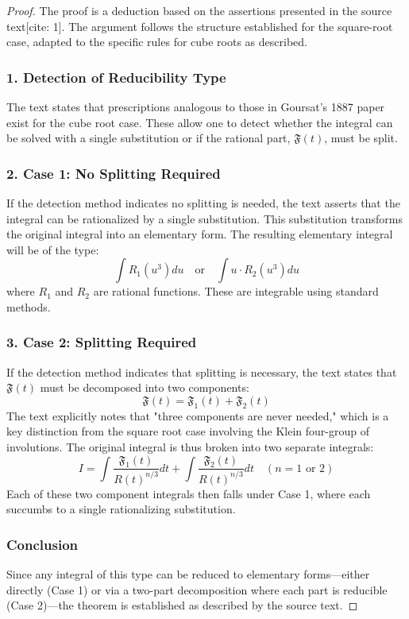 \documentclass{article}
\theoremstyle{plain}
\newcommand{\Fcal}{\mathfrak{F}}
\begin{document}
\begin{proof}
The proof is a deduction based on the assertions presented in the source text[cite: 1]. The argument follows the structure established for the square-root case, adapted to the specific rules for cube roots as described.

\subsubsection*{1. Detection of Reducibility Type}
The text states that prescriptions analogous to those in Goursat's 1887 paper exist for the cube root case. These allow one to detect whether the integral can be solved with a single substitution or if the rational part, $\Fcal(t)$, must be split.

\subsubsection*{2. Case 1: No Splitting Required}
If the detection method indicates no splitting is needed, the text asserts that the integral can be rationalized by a single substitution. This substitution transforms the original integral into an elementary form. The resulting elementary integral will be of the type:
$$ \int R_1(u^3) du \quad \text{or} \quad \int u \cdot R_2(u^3) du $$
where $R_1$ and $R_2$ are rational functions. These are integrable using standard methods.

\subsubsection*{3. Case 2: Splitting Required}
If the detection method indicates that splitting is necessary, the text states that $\Fcal(t)$ must be decomposed into two components:
$$ \Fcal(t) = \Fcal_1(t) + \Fcal_2(t) $$
The text explicitly notes that "three components are never needed," which is a key distinction from the square root case involving the Klein four-group of involutions. The original integral is thus broken into two separate integrals:
$$ I = \int \frac{\Fcal_1(t)}{R(t)^{n/3}} dt + \int \frac{\Fcal_2(t)}{R(t)^{n/3}} dt \quad (n=1 \text{ or } 2)$$
Each of these two component integrals then falls under Case 1, where each succumbs to a single rationalizing substitution.

\subsubsection*{Conclusion}
Since any integral of this type can be reduced to elementary forms—either directly (Case 1) or via a two-part decomposition where each part is reducible (Case 2)—the theorem is established as described by the source text.
\end{proof}
\end{document}

